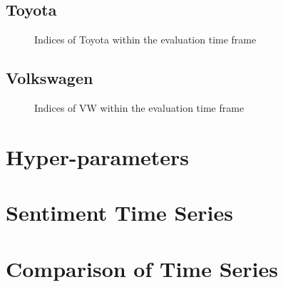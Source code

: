 \subsection{Toyota}
\label{ss:analysis-datasets-toyota}

\begin{figure}[hbt]
    \centering
    
    
    \caption{Indices of Toyota within the evaluation time frame}
    \label{fig:analysis-indices-toyota}
\end{figure}   

\subsection{Volkswagen}
\label{ss:analysis-datasets-vw}

\begin{figure}[hbt]
    \centering
    
    
    \caption{Indices of VW within the evaluation time frame}
    \label{fig:analysis-indices-vw}
\end{figure}   

\section{Hyper-parameters}
\label{s:analysis-pipelines}

\section{Sentiment Time Series}
\label{s:analysis-sentiments}

\section{Comparison of Time Series}
\label{s:analysis-granger}

